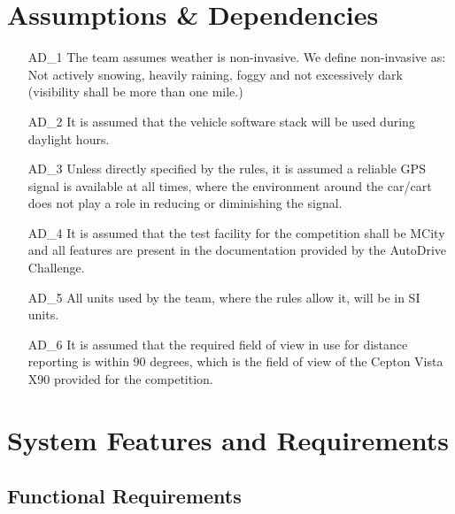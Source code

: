 \documentclass[12pt]{article}
\begin{document}
\section{Assumptions \& Dependencies}
\begin{itemize}
    \item[AD\_1] The team assumes weather is non-invasive. We define non-invasive as: Not actively snowing, heavily raining, foggy and not excessively dark (visibility shall be more than one mile.)
    \item[AD\_2] It is assumed that the vehicle software stack will be used during daylight hours.
    \item[AD\_3] Unless directly specified by the rules, it is assumed a reliable GPS signal is available at all times, where the environment around the car/cart does not play a role in reducing or diminishing the signal.
    \item[AD\_4] It is assumed that the test facility for the competition shall be MCity and all features are present in the documentation provided by the AutoDrive Challenge.
    \item[AD\_5] All units used by the team, where the rules allow it, will be in SI units.
    \item[AD\_6] It is assumed that the required field of view in use for distance reporting is within 90 degrees, which is the field of view of the Cepton Vista X90 provided for the competition.
\end{itemize}


\section{System Features and Requirements}

\subsection{Functional Requirements}








\end{document}
